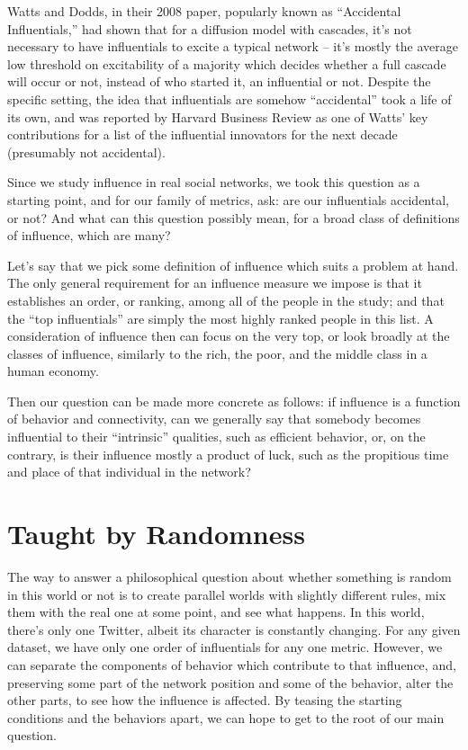 \documentclass[10pt,oneside]{memoir}
\begin{document}
Watts and Dodds, in their 2008 paper, popularly known as ``Accidental Influentials,'' had shown that for a diffusion model with cascades, it's not necessary to have influentials to excite a typical network -- it's mostly the average low threshold on excitability of a majority which decides whether a full cascade will occur or not, instead of who started it, an influential or not.  Despite the specific setting, the idea that influentials are somehow ``accidental'' took a life of its own, and was reported by Harvard Business Review as one of Watts' key contributions for a list of the influential innovators for the next decade (presumably not accidental).


Since we study influence in real social networks, we took this question as a starting point, and for our family of metrics, ask: are our influentials accidental, or not?  And what can this question possibly mean, for a broad class of definitions of influence, which are many?


Let's say that we pick some definition of influence which suits a problem at hand.  The only general requirement for an influence measure we impose is that it establishes an order, or ranking, among all of the people in the study; and that the ``top influentials'' are simply the most highly ranked people in this list.  A consideration of influence then can focus on the very top, or look broadly at the classes of influence, similarly to the rich, the poor, and the middle class in a human economy.


Then our question can be made more concrete as follows: if influence is a function of behavior and connectivity, can we generally say that somebody becomes influential to their ``intrinsic'' qualities, such as efficient behavior, or, on the contrary, is their influence mostly a product of luck, such as the propitious time and place of that individual in the network?


\section{Taught by Randomness}
\label{taughtbyrandomness}

The way to answer a philosophical question about whether something is random in this world or not is to create parallel worlds with slightly different rules, mix them with the real one at some point, and see what happens.  In this world, there's only one Twitter, albeit its character is constantly changing.  For any given dataset, we have only one order of influentials for any one metric.  However, we can separate the components of behavior which contribute to that influence, and, preserving some part of the network position and some of the behavior, alter the other parts, to see how the influence is affected.  By teasing the starting conditions and the behaviors apart, we can hope to get to the root of our main question.
\end{document}
